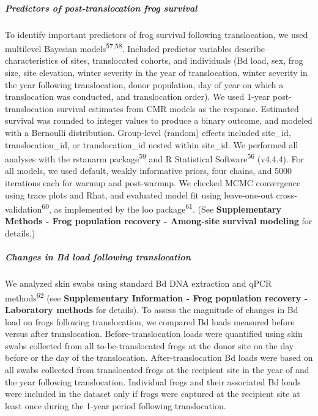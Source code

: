 \documentclass[
  letterpaper,
  DIV=11,
  numbers=noendperiod]{scrartcl}
\let\oldsubparagraph\subparagraph
\renewcommand{\subparagraph}[1]{\oldsubparagraph{#1}\mbox{}}
\begin{document}
\subparagraph{Predictors of post-translocation frog
survival}\label{predictors-of-post-translocation-frog-survival}

To identify important predictors of frog survival following
translocation, we used multilevel Bayesian
models\textsuperscript{57,58}. Included predictor variables describe
characteristics of sites, translocated cohorts, and individuals (Bd
load, sex, frog size, site elevation, winter severity in the year of
translocation, winter severity in the year following translocation,
donor population, day of year on which a translocation was conducted,
and translocation order). We used 1-year post-translocation survival
estimates from CMR models as the response. Estimated survival was
rounded to integer values to produce a binary outcome, and modeled with
a Bernoulli distribution. Group-level (random) effects included
site\_id, translocation\_id, or translocation\_id nested within
site\_id. We performed all analyses with the rstanarm
package\textsuperscript{59} and R Statistical
Software\textsuperscript{56} (v4.4.4). For all models, we used default,
weakly informative priors, four chains, and 5000 iterations each for
warmup and post-warmup. We checked MCMC convergence using trace plots
and Rhat, and evaluated model fit using leave-one-out
cross-validation\textsuperscript{60}, as implemented by the loo
package\textsuperscript{61}. (See \textbf{Supplementary Methods - Frog
population recovery - Among-site survival modeling} for details.)

\subparagraph{Changes in Bd load following
translocation}\label{changes-in-bd-load-following-translocation}

We analyzed skin swabs using standard Bd DNA extraction and qPCR
methods\textsuperscript{62} (see \textbf{Supplementary Information -
Frog population recovery - Laboratory methods} for details). To assess
the magnitude of changes in Bd load on frogs following translocation, we
compared Bd loads measured before versus after translocation.
Before-translocation loads were quantified using skin swabs collected
from all to-be-translocated frogs at the donor site on the day before or
the day of the translocation. After-translocation Bd loads were based on
all swabs collected from translocated frogs at the recipient site in the
year of and the year following translocation. Individual frogs and their
associated Bd loads were included in the dataset only if frogs were
captured at the recipient site at least once during the 1-year period
following translocation.
\end{document}
